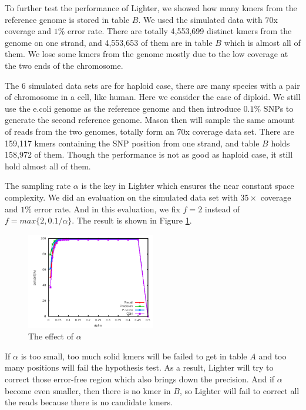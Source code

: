 \documentclass[10pt]{article}
\begin{document}
To further test the performance of Lighter, we showed how many kmers from the reference genome is stored in table $B$. We used the simulated data with $70$x coverage and $1\%$ error rate. There are totally 4,553,699 distinct kmers from the genome on one strand, and 4,553,653 of them are in table $B$ which is almost all of them. We lose some kmers from the genome mostly due to the low coverage at the two ends of the chromosome.

The 6 simulated data sets are for haploid case, there are many species with a pair of chromosome in a cell, like human. Here we consider the case of diploid. We still use the e.coli genome as the reference genome and then introduce $0.1\%$ SNPs to generate the second reference genome. Mason then will sample the same amount of reads from the two genomes, totally form an $70$x coverage data set. There are 159,117 kmers containing the SNP position from one strand, and table $B$ holds 158,972 of them. Though the performance is not as good as haploid case, it still hold almost all of them. 

The sampling rate $\alpha$ is the key in Lighter which ensures the near constant space complexity. We did an evaluation on the simulated data set with $35\times$ coverage and $1\%$ error rate. And in this evaluation, we fix $f=2$ instead of $f=max\{2,0.1/\alpha\}$. The result is shown in Figure \ref{fig:alpha}.

\begin{figure}[h!]
\begin{center}
\includegraphics[width=0.5\textwidth]{alpha.png}
\caption{The effect of $\alpha$\label{fig:alpha}}
\end{center}
\end{figure}

If $\alpha$ is too small, too much solid kmers will be failed to get in table $A$ and too many positions will fail the hypothesis test. As a result, Lighter will try to correct those error-free region which also brings down the precision. And if $\alpha$ become even smaller, then there is no kmer in $B$, so Lighter will fail to correct all the reads because there is no candidate kmers. 
\end{document}
